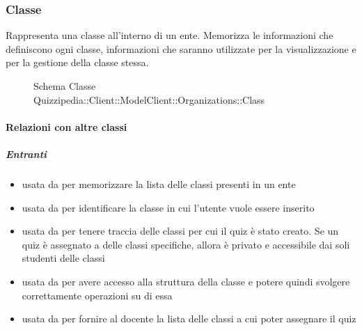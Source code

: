 \subsubsection{Classe }
Rappresenta una classe all'interno di un ente. Memorizza le informazioni che definiscono ogni classe,
informazioni che saranno utilizzate per la visualizzazione e per la gestione della classe stessa.
\begin{figure}[H]
\centering
\noindent{}
\caption[Schema Classe Class]{Schema Classe Quizzipedia::Client::ModelClient::Organizations::Class}
\end{figure}
\paragraph{Relazioni con altre classi}
\subparagraph{Entranti}
\begin{itemize}
\item usata da  per memorizzare la lista
delle classi presenti in un ente
\item usata da  per identificare la classe
in cui l'utente vuole essere inserito
\item usata da  per tenere traccia delle classi per
cui il quiz è stato creato. Se un quiz è assegnato a delle classi specifiche, allora è privato e
accessibile dai soli studenti delle classi
\item usata da  per avere
accesso alla struttura della classe e potere quindi svolgere correttamente operazioni su di
essa
\item usata da  per fornire al docente la lista delle classi a cui poter assegnare il quiz
\end{itemize}
